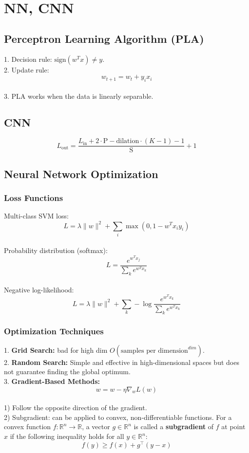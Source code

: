 \section{NN, CNN}
\subsection{Perceptron Learning Algorithm (PLA)}
1. Decision rule: $\text{sign}(w^T x) \neq y$. \\
2. Update rule:
    \[
    w_{t+1} = w_t + y_i x_i
    \] \\
3. PLA works when the data is linearly separable. \\

\subsection{CNN}
    \[
    L_{\text{out}} = \frac{L_{\text{in}} + 2 \cdot \text{P} - \text{dilation} \cdot (K-1) - 1}{\text{S}} + 1
    \]

\subsection{Neural Network Optimization}
\subsubsection{Loss Functions}
    Multi-class SVM loss:
    \[
    L = \lambda \|w\|^2 + \sum_i \max(0, 1 - w^T x_i y_i)
    \] \\
    Probability distribution (softmax):
    \[
    L = \frac{e^{w^T x_j}}{\sum_k e^{w^T x_k}}
    \]\\
    Negative log-likelihood:
    \[
    L = \lambda \|w\|^2 + \sum_{k} - \log \frac{e^{w^T x_k}}{\sum_k e^{w^T x_k}}
    \]

\subsubsection{Optimization Techniques}
1. \textbf{Grid Search:} bad for high dim $O(\text{samples per dimension}^{dim})$. \\
2. \textbf{Random Search:} Simple and effective in high-dimensional spaces but does not guarantee finding the global optimum. \\
3. \textbf{Gradient-Based Methods:} 
        \[
        w = w - \eta \nabla_w L(w)
        \] \\
   1) Follow the opposite direction of the gradient. \\
   2) Subgradient: can be applied to convex, non-differentiable functions. For a convex function \( f: \mathbb{R}^n \to \mathbb{R} \), a vector \( g \in \mathbb{R}^n \) is called a \textbf{subgradient} of \( f \) at point \( x \) if the following inequality holds for all \( y \in \mathbb{R}^n \):
    \[
    f(y) \geq f(x) + g^\top (y - x)
    \]


